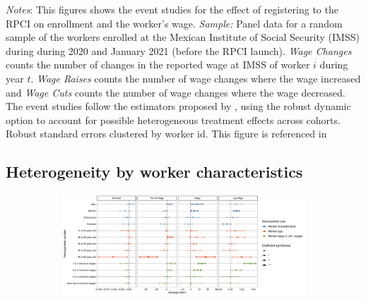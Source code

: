 \documentclass[oneside,11pt]{article}
\begin{document}
\scriptsize{
\noindent \textit{Notes}: This figures shows the event studies for the effect of registering to the RPCI on enrollment and the worker's wage. \textit{Sample:} Panel data for a random sample of the workers enrolled at the Mexican Institute of Social Security (IMSS) during during 2020 and January 2021 (before the RPCI launch). \textit{Wage Changes} counts the number of changes in the reported wage at IMSS of worker $i$ during year $t$. \textit{Wage Raises} counts the number of wage changes where the wage increased and \textit{Wage Cuts} counts the number of wage changes where the wage decreased. The event studies follow the estimators proposed by \cite{de2020two}, using the robust dynamic option to account for possible heterogeneous treatment effects across cohorts. Robust standard errors clustered by worker id. This figure is referenced in %
}

\clearpage

\subsection{Heterogeneity by worker characteristics}

\begin{figure}[H]
    \centering
    \caption{Heterogeneity by worker characteristics \label{fig:heterogeneity_worker_rpci}}
    
    \begin{subfigure}{\textwidth}
    \includegraphics[width=\textwidth]{04_Figures/muestra_10porciento/dcdh_heterogeneity_worker_characteristics.pdf}
    \end{subfigure}
    
\end{figure}
\end{document}
